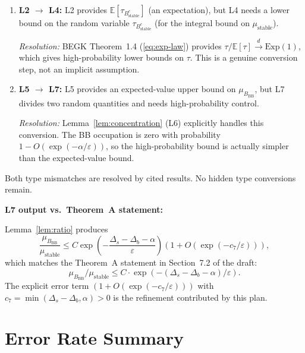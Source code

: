 \documentclass[11pt]{article}
\newcommand{\eps}{\varepsilon}
\newcommand{\Ds}{\Delta_s}
\newcommand{\Db}{\Delta_b}
\newcommand{\Bstable}{B_{\mathrm{stable}}}
\newcommand{\BBB}{B_{\mathrm{BB}}}
\begin{document}
\begin{enumerate}
\item \textbf{L2 $\to$ L4:} L2 provides $\mathbb{E}[\tau_{\Bstable^c}]$
  (an expectation), but L4 needs a lower bound on the random variable
  $\tau_{\Bstable^c}$ (for the integral bound on $\mu_{\mathrm{stable}}$).

  \emph{Resolution:} BEGK Theorem~1.4 (\eqref{eq:exp-law}) provides
  $\tau / \mathbb{E}[\tau] \xrightarrow{d} \mathrm{Exp}(1)$, which gives
  high-probability lower bounds on $\tau$. This is a genuine
  conversion step, not an implicit assumption.

\item \textbf{L5 $\to$ L7:} L5 provides an expected-value upper bound
  on $\mu_\BBB$, but L7 divides two random quantities and needs
  high-probability control.

  \emph{Resolution:} Lemma~\ref{lem:concentration} (L6) explicitly
  handles this conversion. The BB occupation is zero with probability
  $1 - O(\exp(-\alpha/\eps))$, so the high-probability bound is
  actually simpler than the expected-value bound.
\end{enumerate}

Both type mismatches are resolved by cited results. No hidden
type conversions remain.

\medskip
\noindent
\textbf{L7 output vs.\ Theorem~A statement:}

Lemma~\ref{lem:ratio} produces
\[
  \frac{\mu_\BBB}{\mu_{\mathrm{stable}}}
  \leq C \exp\!\left(-\frac{\Ds - \Db - \alpha}{\eps}\right)
  (1 + O(\exp(-c_7/\eps))),
\]
which matches the Theorem~A statement in Section~7.2 of the draft:
\[
  \mu_\BBB / \mu_{\mathrm{stable}}
  \leq C \cdot \exp(-(\Ds - \Db - \alpha)/\eps).
\]
The explicit error term $(1 + O(\exp(-c_7/\eps)))$ with
$c_7 = \min(\Ds - \Db, \alpha) > 0$ is the refinement
contributed by this plan.

\section{Error Rate Summary}
\label{sec:error-summary}
\end{document}
